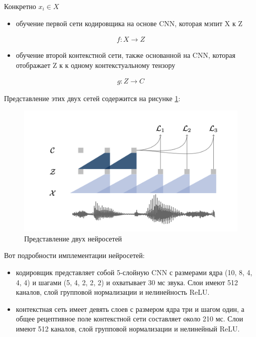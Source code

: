 Конкретно $x_i \in X$
\begin{itemize}
 \item обучение первой сети кодировщика на основе CNN, которая мэпит X к Z
\end{itemize}

\begin{equation}
  \begin{gathered}
    f : X \rightarrow Z
  \end{gathered}
  \label{eq:speach_formula_12}
\end{equation}


\begin{itemize}
  \item обучение второй контекстной сети, также основанной на CNN, которая отображает Z к к одному контекстуальному тензору
\end{itemize}

\begin{equation}
  \begin{gathered}
    g : Z \rightarrow C
  \end{gathered}
  \label{eq:speach_formula_13}
\end{equation}

Представление этих двух сетей содержится на рисунке \ref{pic:wav}:

\begin{figure}[h]
\includegraphics[width=0.75\columnwidth]{./img/wav_0.png}
\centering
\caption{Представление двух нейросетей}
\label{pic:wav}
\end{figure}
  
Вот подробности имплементации нейросетей: 
\begin{itemize}
  \item кодировщик представляет собой 5-слойную CNN с размерами ядра (10, 8, 4, 4, 4) и шагами (5, 4, 2, 2, 2) и охватывает 30 мс звука. Слои имеют 512 каналов, слой групповой нормализации и нелинейность ReLU.
  \item контекстная сеть имеет девять слоев с размером ядра три и шагом один, а общее рецептивное поле контекстной сети составляет около 210 мс. Слои имеют 512 каналов, слой групповой нормализации и нелинейный ReLU.
 \end{itemize}

